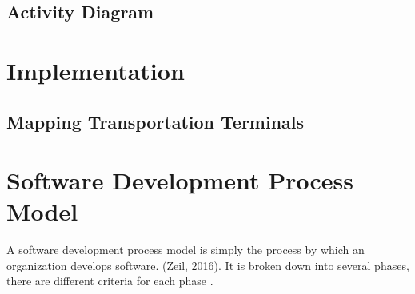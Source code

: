 \documentclass[oneside,12pt]{book}
\begin{document}
\subsection{Activity Diagram}

\section{Implementation}

\subsection{Mapping Transportation Terminals}


\section{Software Development Process Model}
A software development process model is simply the process by which an organization 
develops software. (Zeil, 2016). It is broken down into several phases, there are different criteria for each phase \citep{marciniak1994encyclopedia}.






\end{document}

